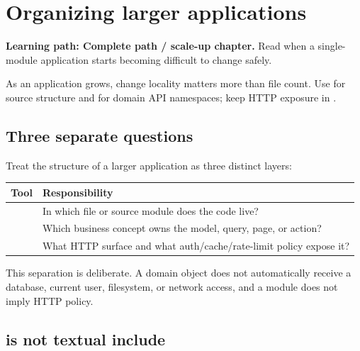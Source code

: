 \chapter{Organizing larger applications}

\noindent\textbf{Learning path: Complete path / scale-up chapter.} Read when a single-module application starts becoming difficult to change safely.\par\medskip



As an application grows, change locality matters more than file count. Use  for source structure and  for domain API namespaces; keep HTTP exposure in .

\section{Three separate questions}

Treat the structure of a larger application as three distinct layers:

\begin{center}
\begin{tabularx}{\textwidth}{@{}l Y@{}}
\toprule
\textbf{Tool} & \textbf{Responsibility} \\
\midrule
{} & In which file or source module does the code live? \\
 & Which business concept owns the model, query, page, or action? \\
 & What HTTP surface and what auth/cache/rate-limit policy expose it? \\
\bottomrule
\end{tabularx}
\end{center}

This separation is deliberate. A domain object does not automatically receive a database, current user, filesystem, or network access, and a module does not imply HTTP policy.

\section{ is not textual include}

